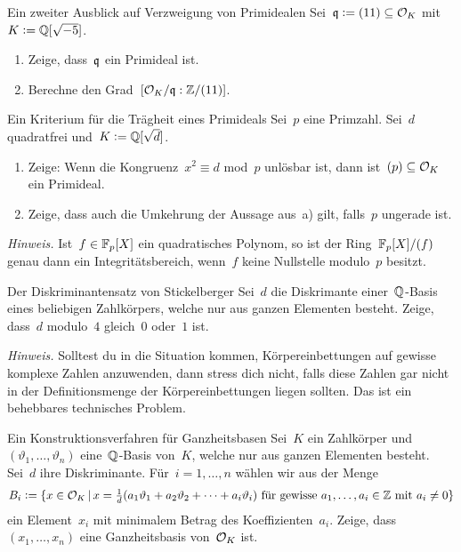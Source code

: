 \documentclass{uebblatt}
\begin{document}

\begin{aufgabe}{Ein zweiter Ausblick auf Verzweigung von Primidealen}
Sei~$\mathfrak{q} \vcentcolon= (11) \subseteq \mathcal{O}_K$ mit~$K \vcentcolon= \mathbb{Q}[\sqrt{-5}]$.
\begin{multicols}{2}
\begin{enumerate}
\item Zeige, dass~$\mathfrak{q}$ ein Primideal ist.
\item Berechne den Grad~$[\mathcal{O}_K/\mathfrak{q} : \mathbb{Z}/(11)]$.
\end{enumerate}
\end{multicols}
\vspace{-1em}
\end{aufgabe}

\begin{aufgabe}{Ein Kriterium für die Trägheit eines Primideals}
Sei~$p$ eine Primzahl. Sei~$d$ quadratfrei und~$K \vcentcolon= \mathbb{Q}[\sqrt{d}]$.
\begin{enumerate}
\item Zeige: Wenn die Kongruenz~$x^2 \equiv d$ mod~$p$ unlösbar ist,
dann ist~$(p) \subseteq \mathcal{O}_K$ ein Primideal.
\item Zeige, dass auch die Umkehrung der Aussage aus~a) gilt, falls~$p$
ungerade ist.
\end{enumerate}
{\tiny\emph{Hinweis.} Ist~$f \in \mathbb{F}_p[X]$ ein quadratisches Polynom, so ist
der Ring~$\mathbb{F}_p[X]/(f)$ genau dann ein Integritätsbereich, wenn~$f$ keine
Nullstelle modulo~$p$ besitzt.\par}
\end{aufgabe}

\begin{aufgabe}{Der Diskriminantensatz von Stickelberger}
Sei~$d$ die Diskrimante einer~$\mathbb{Q}$-Basis eines beliebigen Zahlkörpers, welche
nur aus ganzen Elementen besteht. Zeige, dass~$d$ modulo~$4$ gleich~$0$ oder~$1$ ist.

{\tiny\emph{Hinweis.} Solltest du in die Situation kommen, Körpereinbettungen
auf gewisse komplexe Zahlen anzuwenden, dann stress dich nicht, falls diese
Zahlen gar nicht in der Definitionsmenge der Körpereinbettungen liegen sollten.
Das ist ein behebbares technisches Problem.\par}
\end{aufgabe}

\begin{aufgabe}{Ein Konstruktionsverfahren für Ganzheitsbasen}
Sei~$K$ ein Zahlkörper und~$(\vartheta_1,\ldots,\vartheta_n)$ eine~$\mathbb{Q}$-Basis
von~$K$, welche nur aus ganzen Elementen besteht. Sei~$d$ ihre Diskriminante.
Für~$i = 1, \ldots, n$ wählen wir aus der Menge
\[ B_i \vcentcolon= \{ x \in \mathcal{O}_K \,|\,
  \text{$x = \tfrac{1}{d}(a_1\vartheta_1 + a_2\vartheta_2 + \cdots +
  a_i\vartheta_i)$ für gewisse~$a_1,\ldots,a_i \in \mathbb{Z}$ mit~$a_i
  \neq 0$} \} \]
ein Element~$x_i$ mit minimalem Betrag des Koeffizienten~$a_i$. Zeige,
dass~$(x_1,\ldots,x_n)$ eine Ganzheitsbasis von~$\mathcal{O}_K$ ist.
\end{aufgabe}
\end{document}
